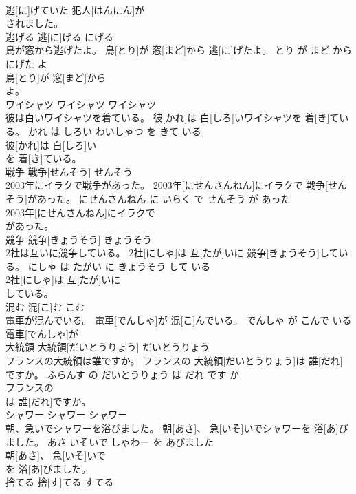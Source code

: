 \documentclass[8pt]{extreport}
\begin{document}
\begin{CJK}{UTF8}{min}
\\	逃[に]げていた 犯人[はんにん]が
\\	されました。		
\\	逃げる	逃[に]げる	にげる	
\\	鳥が窓から逃げたよ。	鳥[とり]が 窓[まど]から 逃[に]げたよ。	とり が まど から にげた よ	
\\	鳥[とり]が 窓[まど]から
\\	よ。		
\\	ワイシャツ	ワイシャツ	ワイシャツ	
\\	彼は白いワイシャツを着ている。	彼[かれ]は 白[しろ]いワイシャツを 着[き]ている。	かれ は しろい わいしゃつ を きて いる	
\\	彼[かれ]は 白[しろ]い
\\	を 着[き]ている。		
\\	戦争	戦争[せんそう]	せんそう	
\\	2003年にイラクで戦争があった。	2003年[にせんさんねん]にイラクで 戦争[せんそう]があった。	にせんさんねん に いらく で せんそう が あった	
\\	2003年[にせんさんねん]にイラクで
\\	があった。		
\\	競争	競争[きょうそう]	きょうそう	
\\	2社は互いに競争している。	2社[にしゃ]は 互[たが]いに 競争[きょうそう]している。	にしゃ は たがい に きょうそう して いる	
\\	2社[にしゃ]は 互[たが]いに
\\	している。		
\\	混む	混[こ]む	こむ	
\\	電車が混んでいる。	電車[でんしゃ]が 混[こ]んでいる。	でんしゃ が こんで いる	
\\	電車[でんしゃ]が
\\	大統領	大統領[だいとうりょう]	だいとうりょう	
\\	フランスの大統領は誰ですか。	フランスの 大統領[だいとうりょう]は 誰[だれ]ですか。	ふらんす の だいとうりょう は だれ です か	
\\	フランスの
\\	は 誰[だれ]ですか。		
\\	シャワー	シャワー	シャワー	
\\	朝、急いでシャワーを浴びました。	朝[あさ]、 急[いそ]いでシャワーを 浴[あ]びました。	あさ いそいで しゃわー を あびました	
\\	朝[あさ]、 急[いそ]いで
\\	を 浴[あ]びました。		
\\	捨てる	捨[す]てる	すてる	

\end{CJK}
\end{document}
